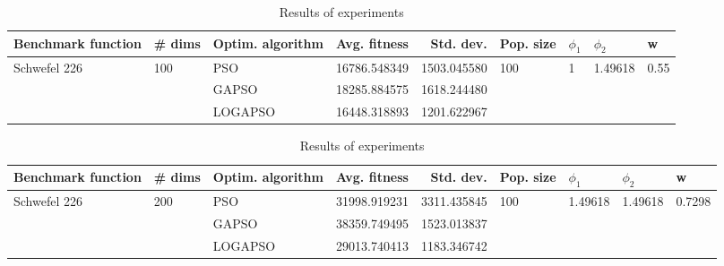 \documentclass{article}
\begin{document}
\begin{table}
\centering
\caption{Results of experiments}
\begin{tabular}{lllrrllll}
\toprule
           Benchmark function &              \# dims & Optim. algorithm &  Avg. fitness &   Std. dev. &            Pop. size &         $\phi_{1}$ &               $\phi_{2}$ &                     w \\
\midrule
\multirow{3}{*}{Schwefel 226} & \multirow{3}{*}{100} &              PSO &  16786.548349 & 1503.045580 & \multirow{3}{*}{100} & \multirow{3}{*}{1} & \multirow{3}{*}{1.49618} & \multirow{3}{*}{0.55} \\
                              &                      &            GAPSO &  18285.884575 & 1618.244480 &                      &                    &                          &                       \\
                              &                      &          LOGAPSO &  16448.318893 & 1201.622967 &                      &                    &                          &                       \\
\bottomrule
\end{tabular}
\end{table}
\begin{table}
\centering
\caption{Results of experiments}
\begin{tabular}{lllrrllll}
\toprule
           Benchmark function &              \# dims & Optim. algorithm &  Avg. fitness &   Std. dev. &            Pop. size &               $\phi_{1}$ &               $\phi_{2}$ &                       w \\
\midrule
\multirow{3}{*}{Schwefel 226} & \multirow{3}{*}{200} &              PSO &  31998.919231 & 3311.435845 & \multirow{3}{*}{100} & \multirow{3}{*}{1.49618} & \multirow{3}{*}{1.49618} & \multirow{3}{*}{0.7298} \\
                              &                      &            GAPSO &  38359.749495 & 1523.013837 &                      &                          &                          &                         \\
                              &                      &          LOGAPSO &  29013.740413 & 1183.346742 &                      &                          &                          &                         \\
\bottomrule
\end{tabular}
\end{table}
\end{document}
